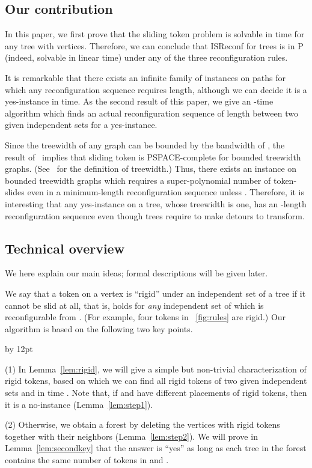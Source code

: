 \documentclass{llncs}
\newenvironment{listing}[1]{\begin{list}{*}{\settowidth{\labelwidth}{#1}\setlength{\leftmargin}{\labelwidth}\advance \leftmargin by 12pt
\setlength{\itemsep}{0pt}\setlength{\parsep}{0pt}\setlength{\topsep}{0pt}\setlength{\parskip}{0pt}}}{\end{list}}
\newcounter{one}
\newcounter{two}
\newcounter{three}
\newcounter{four}
\begin{document}
\subsection{Our contribution}

	In this paper, we first prove that the {\sc sliding token} problem is solvable in  time for any tree  with  vertices. 
	Therefore, we can conclude that {\sc ISReconf} for trees is in P (indeed, solvable in linear time) under any of the three reconfiguration rules.
	
	It is remarkable that there exists an infinite family of instances on paths for which any reconfiguration sequence requires  length, although we can decide it is a yes-instance in  time. 
	As the second result of this paper, we give an -time algorithm which finds an actual reconfiguration sequence of length  between two given independent sets for a yes-instance.
	
	Since the treewidth of any graph  can be bounded by the bandwidth of , the result of~\cite{Wro14} implies that {\sc sliding token} is PSPACE-complete for bounded treewidth graphs. 
(See~\cite{Bod98} for the definition of treewidth.)
	Thus, there exists an instance on bounded treewidth graphs which requires a super-polynomial number of token-slides even in a minimum-length reconfiguration sequence unless .
	Therefore, it is interesting that any yes-instance on a tree, whose treewidth is one, has an -length reconfiguration sequence even though trees require to make detours to transform.


\subsection{Technical overview}
\label{subsec:highlight}

	We here explain our main ideas;
formal descriptions will be given later. 

	We say that a token on a vertex  is ``rigid'' under an independent set  of a tree  if it cannot be slid at all, that is,  holds for {\em any} independent set  of  which is reconfigurable from .
(For example, four tokens in \figurename~\ref{fig:rules} are rigid.)
	Our algorithm is based on the following two key points. 
	\begin{listing}{aaa}
	\item[(1)] In Lemma~\ref{lem:rigid}, we will give a simple but non-trivial characterization of rigid tokens, based on which we can find all rigid tokens of two given independent sets  and  in time . 
	Note that, if  and  have different placements of rigid tokens, then it is a no-instance (Lemma~\ref{lem:step1}).
	\item[(2)] Otherwise, we obtain a forest by deleting the vertices with rigid tokens together with their neighbors (Lemma~\ref{lem:step2}).
	We will prove in Lemma~\ref{lem:secondkey} that the answer is ``yes'' as long as each tree in the forest contains the same number of tokens in  and . 
	\end{listing}
\end{document}
